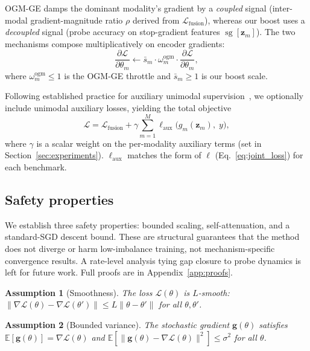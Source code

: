 \documentclass{article}
\newtheorem{assumption}{Assumption}
\newcommand{\loss}{\mathcal{L}}
\newcommand{\sg}{\operatorname{sg}}
\begin{document}
OGM-GE damps the dominant modality's gradient by a \emph{coupled} signal (inter-modal gradient-magnitude ratio $\rho$ derived from $\loss_{\text{fusion}}$), whereas our boost uses a \emph{decoupled} signal (probe accuracy on stop-gradient features $\sg[\mathbf{z}_m]$). The two mechanisms compose multiplicatively on encoder gradients:
%
\begin{equation}
\label{eq:combined}
\frac{\partial \loss}{\partial \theta_m} \leftarrow \bar{s}_m \cdot \omega_m^{\text{ogm}} \cdot \frac{\partial \loss}{\partial \theta_m},
\end{equation}
%
where $\omega_m^{\text{ogm}} \leq 1$ is the OGM-GE throttle and $\bar{s}_m \geq 1$ is our boost scale. 

Following established practice for auxiliary unimodal supervision~\citep{guo2024cggm}, we optionally include unimodal auxiliary losses, yielding the total objective
%
\begin{equation}
\label{eq:total_loss}
\loss = \loss_{\text{fusion}} + \gamma \sum_{m=1}^{M} \ell_{\text{aux}}\!\bigl(g_m(\mathbf{z}_m),\; y\bigr),
\end{equation}
%
where $\gamma$ is a scalar weight on the per-modality auxiliary terms (set in Section~\ref{sec:experiments}). $\ell_{\text{aux}}$ matches the form of $\ell$ (Eq.~\eqref{eq:joint_loss}) for each benchmark.


\subsection{Safety properties}
\label{sec:convergence}

We establish three safety properties: bounded scaling, self-attenuation, and a standard-SGD descent bound. These are structural guarantees that the method does not diverge or harm low-imbalance training, not mechanism-specific convergence results. A rate-level analysis tying gap closure to probe dynamics is left for future work. Full proofs are in Appendix~\ref{app:proofs}.

\begin{assumption}[Smoothness]
\label{asm:smooth}
The loss $\loss(\theta)$ is $L$-smooth: $\|\nabla \loss(\theta) - \nabla \loss(\theta')\| \leq L\|\theta - \theta'\|$ for all $\theta, \theta'$.
\end{assumption}

\begin{assumption}[Bounded variance]
\label{asm:variance}
The stochastic gradient $\mathbf{g}(\theta)$ satisfies $\mathbb{E}[\mathbf{g}(\theta)] = \nabla \loss(\theta)$ and $\mathbb{E}[\|\mathbf{g}(\theta) - \nabla \loss(\theta)\|^2] \leq \sigma^2$ for all $\theta$.
\end{assumption}
\end{document}
